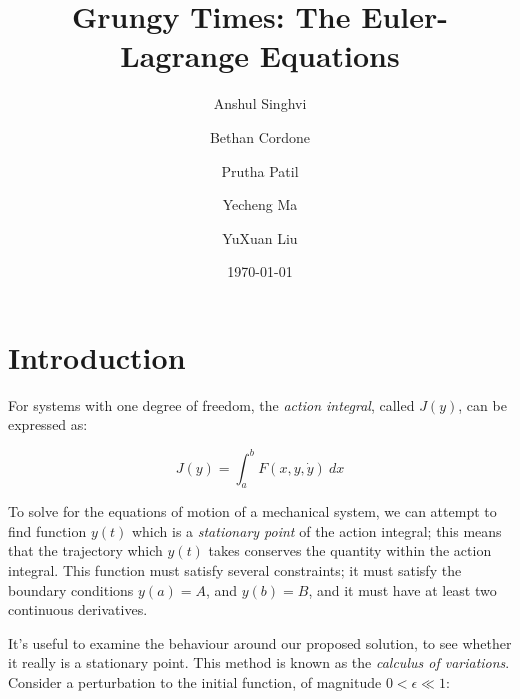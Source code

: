 \documentclass[%
 amsmath,amssymb,
aps,
 fleqn,
 notitlepage,
]{revtex4-2}
\begin{document}

\title{Grungy Times: The Euler-Lagrange Equations}

\author{Anshul Singhvi}
\author{Bethan Cordone}
\author{Prutha Patil}%
\author{Yecheng Ma}
\author{YuXuan Liu}

%

\date{\today}%

\maketitle

\linespread{1.3}

\section{Introduction}

For systems with one degree of freedom, the \emph{action integral}, called $J(y)$, can be expressed as:

\begin{equation}\label{eq: action}
    J(y) = \int_a^b F(x, y, \dot y) ~ dx
\end{equation}

To solve for the equations of motion of a mechanical system, we can attempt to find function $y(t)$ which is a \emph{stationary point} of the action integral; this means that the trajectory which $y(t)$ takes conserves the quantity within the action integral.  This function must satisfy several constraints; it must satisfy the boundary conditions $y(a) = A$, and $y(b) = B$, and it must have at least two continuous derivatives.

It's useful to examine the behaviour around our proposed solution, to see whether it really is a stationary point.  This method is known as the \textit{calculus of variations}.
Consider a perturbation to the initial function, of magnitude $0 < \epsilon \ll 1$:
\end{document}
